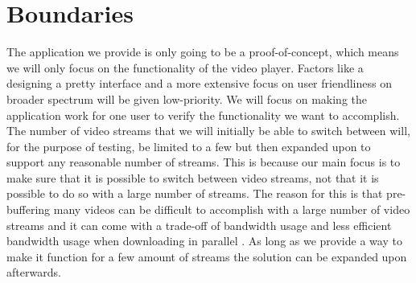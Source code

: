 \section{Boundaries}
\label{sec:boundaries}

The application we provide is only going to be a proof-of-concept, which means we will only focus on the functionality of the video player. Factors like a designing a pretty interface and a more extensive focus on user friendliness on broader spectrum will be given low-priority. We will focus on making the application work for one user to verify the functionality we want to accomplish. The number of video streams that we will initially be able to switch between will, for the purpose of testing, be limited to a few but then expanded upon to support any reasonable number of streams. This is because our main focus is to make sure that it is possible to switch between video streams, not that it is possible to do so with a large number of streams. The reason for this is that pre-buffering many videos can be difficult to accomplish with a large number of video streams and it can come with a trade-off of bandwidth usage \cite{watchingprefetching} and less efficient bandwidth usage when downloading in parallel \cite{scalableOnDemand}. As long as we provide a way to make it function for a few amount of streams the solution can be expanded upon afterwards.